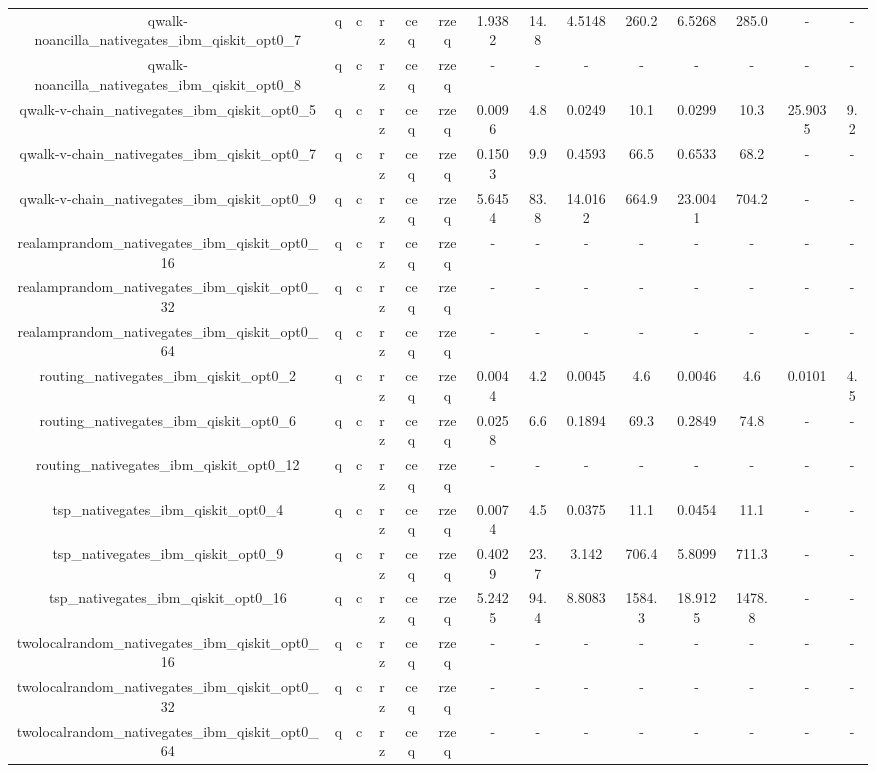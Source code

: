 \begin{table}[htb]
{\begin{tabular}{|c|c|c|c|c|c|c|c|c|c|c|c|c|c|}
qwalk-noancilla_nativegates_ibm_qiskit_opt0_7 & q & c & rz & ceq & rzeq & 1.9382 & 14.8 & 4.5148 & 260.2 & 6.5268 & 285.0 & - & - \\ 
qwalk-noancilla_nativegates_ibm_qiskit_opt0_8 & q & c & rz & ceq & rzeq & - & - & - & - & - & - & - & - \\ 
qwalk-v-chain_nativegates_ibm_qiskit_opt0_5 & q & c & rz & ceq & rzeq & 0.0096 & 4.8 & 0.0249 & 10.1 & 0.0299 & 10.3 & 25.9035 & 9.2 \\ 
qwalk-v-chain_nativegates_ibm_qiskit_opt0_7 & q & c & rz & ceq & rzeq & 0.1503 & 9.9 & 0.4593 & 66.5 & 0.6533 & 68.2 & - & - \\ 
qwalk-v-chain_nativegates_ibm_qiskit_opt0_9 & q & c & rz & ceq & rzeq & 5.6454 & 83.8 & 14.0162 & 664.9 & 23.0041 & 704.2 & - & - \\ 
realamprandom_nativegates_ibm_qiskit_opt0_16 & q & c & rz & ceq & rzeq & - & - & - & - & - & - & - & - \\ 
realamprandom_nativegates_ibm_qiskit_opt0_32 & q & c & rz & ceq & rzeq & - & - & - & - & - & - & - & - \\ 
realamprandom_nativegates_ibm_qiskit_opt0_64 & q & c & rz & ceq & rzeq & - & - & - & - & - & - & - & - \\ 
routing_nativegates_ibm_qiskit_opt0_2 & q & c & rz & ceq & rzeq & 0.0044 & 4.2 & 0.0045 & 4.6 & 0.0046 & 4.6 & 0.0101 & 4.5 \\ 
routing_nativegates_ibm_qiskit_opt0_6 & q & c & rz & ceq & rzeq & 0.0258 & 6.6 & 0.1894 & 69.3 & 0.2849 & 74.8 & - & - \\ 
routing_nativegates_ibm_qiskit_opt0_12 & q & c & rz & ceq & rzeq & - & - & - & - & - & - & - & - \\ 
tsp_nativegates_ibm_qiskit_opt0_4 & q & c & rz & ceq & rzeq & 0.0074 & 4.5 & 0.0375 & 11.1 & 0.0454 & 11.1 & - & - \\ 
tsp_nativegates_ibm_qiskit_opt0_9 & q & c & rz & ceq & rzeq & 0.4029 & 23.7 & 3.142 & 706.4 & 5.8099 & 711.3 & - & - \\ 
tsp_nativegates_ibm_qiskit_opt0_16 & q & c & rz & ceq & rzeq & 5.2425 & 94.4 & 8.8083 & 1584.3 & 18.9125 & 1478.8 & - & - \\ 
twolocalrandom_nativegates_ibm_qiskit_opt0_16 & q & c & rz & ceq & rzeq & - & - & - & - & - & - & - & - \\ 
twolocalrandom_nativegates_ibm_qiskit_opt0_32 & q & c & rz & ceq & rzeq & - & - & - & - & - & - & - & - \\ 
twolocalrandom_nativegates_ibm_qiskit_opt0_64 & q & c & rz & ceq & rzeq & - & - & - & - & - & - & - & - \\ 

\end{tabular}}
\end{table}
